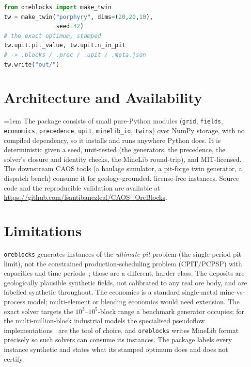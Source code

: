 \documentclass[journal]{IEEEtran}
\begin{document}
\noindent\begin{minipage}{\linewidth}
\begin{lstlisting}[language=Python]
from oreblocks import make_twin
tw = make_twin("porphyry", dims=(20,20,10),
               seed=42)
# the exact optimum, stamped
tw.upit.pit_value, tw.upit.n_in_pit
# -> .blocks / .prec / .upit / .meta.json
tw.write("out/")
\end{lstlisting}
\end{minipage}

\section{Architecture and Availability}\label{sec:arch}

{\raggedright\parindent=1em
The package consists of small pure-Python modules (\texttt{grid}, \texttt{fields}, \texttt{economics},
\texttt{precedence}, \texttt{upit}, \texttt{minelib\_io}, \texttt{twins}) over NumPy storage, with no compiled
dependency, so it installs and runs anywhere Python does. It is deterministic given a seed, unit-tested (the
generators, the precedence, the solver's closure and identity checks, the MineLib round-trip), and MIT-licensed.
The downstream CAOS tools (a haulage simulator, a pit-forge twin generator, a dispatch bench) consume it for
geology-grounded, license-free instances. Source code and the reproducible validation are available at
\url{https://github.com/fsantibanezleal/CAOS_OreBlocks}.\par}

\section{Limitations}\label{sec:limits}

\texttt{oreblocks} generates instances of the \emph{ultimate-pit} problem (the single-period
pit limit), not the constrained production-scheduling problem (CPIT/PCPSP) with capacities and time
periods~\cite{minelib}; those are a different, harder class. The deposits are geologically plausible synthetic
fields, not calibrated to any real ore body, and are labelled synthetic throughout. The economics is a standard
single-metal mine-vs-process model; multi-element or blending economics would need extension. The exact solver
targets the $10^3$--$10^5$-block range a benchmark generator occupies; for the multi-million-block industrial
models the specialised pseudoflow implementations~\cite{hochbaum} are the tool of choice, and \texttt{oreblocks}
writes MineLib format precisely so such solvers can consume its instances. The package labels every instance
synthetic and states what its stamped optimum does and does not certify.
\end{document}
